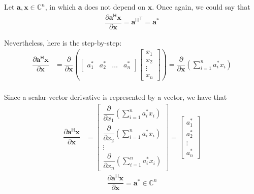 \documentclass{article}
\newcommand{\trans}{\mathsf{T}}
\newcommand{\hermit}{\mathsf{H}}
\begin{document}
Let \(\mathbf{a, x} \in \mathbb{C}^{n}\), in which \(\mathbf{a}\) does not depend on \(\mathbf{x}\). Once again, we could say that
\begin{align}
    \dfrac{\partial \mathbf{a}^\hermit \mathbf{x}}{\partial \mathbf{x}} = {\mathbf{a}^\hermit}^\trans = \mathbf{a}^*
\end{align}

Nevertheless, here is the step-by-step:
\begin{align}
    \dfrac{\partial \mathbf{a}^\hermit \mathbf{x}}{\partial \mathbf{x}} &= \dfrac{\partial}{\partial \mathbf{x}} \left(
    \begin{bmatrix}
        a^*_1 & a^*_2 & \dots & a^*_n
    \end{bmatrix} \begin{bmatrix}
        x_{1} \\ x_{2} \\ \vdots \\ x_{n}
    \end{bmatrix} \right) 
    = \dfrac{\partial}{\partial \mathbf{x}} \left( \sum_{i = 1}^n a^*_ix_i \right) \\
\end{align}

Since a scalar-vector derivative is represented by a vector, we have that
\begin{align}
    \dfrac{\partial \mathbf{a}^\hermit \mathbf{x}}{\partial \mathbf{x}} &= \begin{bmatrix}
        \dfrac{\partial}{\partial x_1} \left( \sum_{i = 1}^n a^*_ix_i \right) \\ \dfrac{\partial}{\partial x_2} \left( \sum_{i = 1}^n a^*_ix_i \right) \\ \vdots \\ \dfrac{\partial}{\partial x_n} \left( \sum_{i = 1}^n a^*_ix_i \right) 
    \end{bmatrix}
    = \begin{bmatrix}
        a^*_1 \\ a^*_2 \\ \vdots \\ a^*_n
    \end{bmatrix}
\end{align}
\begin{align}
    \boxed{\dfrac{\partial \mathbf{a}^\hermit \mathbf{x}}{\partial \mathbf{x}} = \mathbf{a}^* \in \mathbb{C}^{n}}
\end{align}
\end{document}
